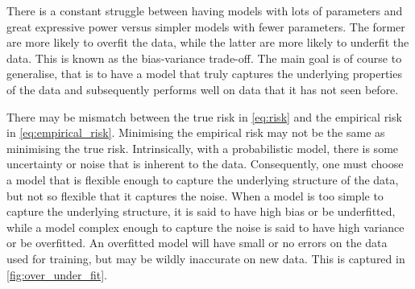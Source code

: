 There is a constant struggle between having models with lots of parameters and great expressive power versus simpler models with fewer parameters.
The former are more likely to overfit the data, while the latter are more likely to underfit the data.
This is known as the bias-variance trade-off.
The main goal is of course to generalise, that is to have a model that truly captures the underlying properties of the data and subsequently performs well on data that it has not seen before.

There may be mismatch between the true risk in \cref{eq:risk} and the empirical risk in \cref{eq:empirical_risk}.
Minimising the empirical risk may not be the same as minimising the true risk.
Intrinsically, with a probabilistic model, there is some uncertainty or noise that is inherent to the data.
Consequently, one must choose a model that is flexible enough to capture the underlying structure of the data, but not so flexible that it captures the noise.
When a model is too simple to capture the underlying structure, it is said to have high bias or be underfitted, while a model complex enough to capture the noise is said to have high variance or be overfitted.
An overfitted model will have small or no errors on the data used for training, but may be wildly inaccurate on new data.
This is captured in \cref{fig:over_under_fit}.

